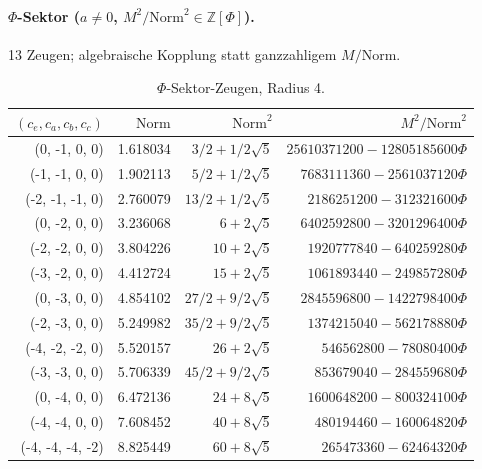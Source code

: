 \paragraph{$\Phi$-Sektor ($a\neq 0$, $M^2/\mathrm{Norm}^2\in\mathbb{Z}[\Phi]$).}
13 Zeugen; algebraische Kopplung statt ganzzahligem $M/\mathrm{Norm}$.

\begin{table}[ht]
  \centering
  \caption{$\Phi$-Sektor-Zeugen, Radius 4.}
  \label{tab:eabc-phi-r4}
  \begin{tabular}{rrrr}
    \toprule
    $(c_e,c_a,c_b,c_c)$ & $\mathrm{Norm}$ & $\mathrm{Norm}^2$ & $M^2/\mathrm{Norm}^2$ \\
    \midrule
    (0, -1, 0, 0) & 1.618034 & $3/2 + 1/2\sqrt{5}$ & $25610371200 - 12805185600\Phi$ \\
    (-1, -1, 0, 0) & 1.902113 & $5/2 + 1/2\sqrt{5}$ & $7683111360 - 2561037120\Phi$ \\
    (-2, -1, -1, 0) & 2.760079 & $13/2 + 1/2\sqrt{5}$ & $2186251200 - 312321600\Phi$ \\
    (0, -2, 0, 0) & 3.236068 & $6 + 2\sqrt{5}$ & $6402592800 - 3201296400\Phi$ \\
    (-2, -2, 0, 0) & 3.804226 & $10 + 2\sqrt{5}$ & $1920777840 - 640259280\Phi$ \\
    (-3, -2, 0, 0) & 4.412724 & $15 + 2\sqrt{5}$ & $1061893440 - 249857280\Phi$ \\
    (0, -3, 0, 0) & 4.854102 & $27/2 + 9/2\sqrt{5}$ & $2845596800 - 1422798400\Phi$ \\
    (-2, -3, 0, 0) & 5.249982 & $35/2 + 9/2\sqrt{5}$ & $1374215040 - 562178880\Phi$ \\
    (-4, -2, -2, 0) & 5.520157 & $26 + 2\sqrt{5}$ & $546562800 - 78080400\Phi$ \\
    (-3, -3, 0, 0) & 5.706339 & $45/2 + 9/2\sqrt{5}$ & $853679040 - 284559680\Phi$ \\
    (0, -4, 0, 0) & 6.472136 & $24 + 8\sqrt{5}$ & $1600648200 - 800324100\Phi$ \\
    (-4, -4, 0, 0) & 7.608452 & $40 + 8\sqrt{5}$ & $480194460 - 160064820\Phi$ \\
    (-4, -4, -4, -2) & 8.825449 & $60 + 8\sqrt{5}$ & $265473360 - 62464320\Phi$ \\
    \bottomrule
  \end{tabular}
\end{table}
